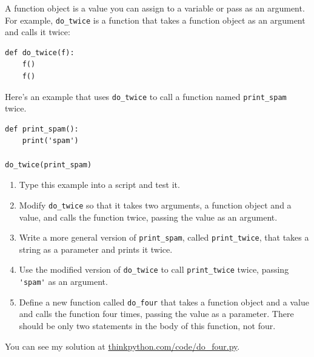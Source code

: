 \documentclass[10pt]{book}
\begin{document}
\begin{ex}

A function object is a value you can assign to a variable
or pass as an argument.  For example, \verb"do_twice" is a function
that takes a function object as an argument and calls it twice:

\beforeverb
\begin{verbatim}
def do_twice(f):
    f()
    f()
\end{verbatim}
\afterverb

Here's an example that uses \verb"do_twice" to call a function
named \verb"print_spam" twice.

\beforeverb
\begin{verbatim}
def print_spam():
    print('spam')

do_twice(print_spam)
\end{verbatim}
\afterverb

\begin{enumerate}

\item Type this example into a script and test it.

\item Modify \verb"do_twice" so that it takes two arguments, a
function object and a value, and calls the function twice,
passing the value as an argument.

\item Write a more general version of \verb"print_spam", called
\verb"print_twice", that takes a string as a parameter and prints
it twice.

\item Use the modified version of \verb"do_twice" to call
\verb"print_twice" twice, passing \verb"'spam'" as an argument.

\item Define a new function called 
\verb"do_four" that takes a function object and a value
and calls the function four times, passing the value
as a parameter.  There should be only
two statements in the body of this function, not four.

\end{enumerate}

You can see my solution at \url{thinkpython.com/code/do_four.py}.

\end{ex}
\end{document}
